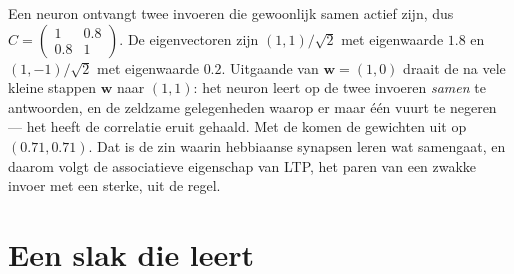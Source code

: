 \begin{example}\label{ex:b3:learning-memory:two-inputs}
Een neuron ontvangt twee invoeren die gewoonlijk samen actief zijn, dus $C =
\begin{pmatrix} 1 & 0.8 \\ 0.8 & 1\end{pmatrix}$. De eigenvectoren zijn
$(1,1)/\sqrt{2}$ met eigenwaarde $1.8$ en $(1,-1)/\sqrt{2}$ met
eigenwaarde $0.2$. Uitgaande van $\mathbf{w} = (1, 0)$ draait de  na vele kleine stappen $\mathbf{w}$ naar $(1,1)$: het neuron
leert op de twee invoeren \emph{samen} te antwoorden, en de zeldzame
gelegenheden waarop er maar één vuurt te negeren --- het heeft de
correlatie eruit gehaald. Met de  komen de gewichten uit
op $(0.71, 0.71)$. Dat is de zin waarin hebbiaanse synapsen leren wat
samengaat, en daarom volgt de associatieve eigenschap van LTP, het
paren van een zwakke invoer met een sterke, uit de regel.
\end{example}

\section{Een slak die leert}

